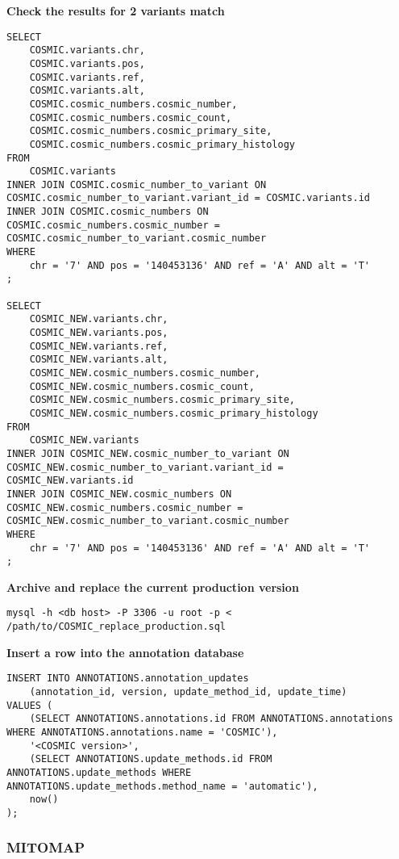 \documentclass[11pt, a4paper]{article}
\begin{document}
\textbf{Check the results for 2 variants match}

\begin{lstlisting}
SELECT 
	COSMIC.variants.chr,
	COSMIC.variants.pos,
	COSMIC.variants.ref,
	COSMIC.variants.alt,
	COSMIC.cosmic_numbers.cosmic_number,
	COSMIC.cosmic_numbers.cosmic_count,
	COSMIC.cosmic_numbers.cosmic_primary_site,
	COSMIC.cosmic_numbers.cosmic_primary_histology
FROM 
	COSMIC.variants
INNER JOIN COSMIC.cosmic_number_to_variant ON COSMIC.cosmic_number_to_variant.variant_id = COSMIC.variants.id 
INNER JOIN COSMIC.cosmic_numbers ON COSMIC.cosmic_numbers.cosmic_number = COSMIC.cosmic_number_to_variant.cosmic_number 
WHERE 
	chr = '7' AND pos = '140453136' AND ref = 'A' AND alt = 'T'
;

SELECT 
	COSMIC_NEW.variants.chr,
	COSMIC_NEW.variants.pos,
	COSMIC_NEW.variants.ref,
	COSMIC_NEW.variants.alt,
	COSMIC_NEW.cosmic_numbers.cosmic_number,
	COSMIC_NEW.cosmic_numbers.cosmic_count,
	COSMIC_NEW.cosmic_numbers.cosmic_primary_site,
	COSMIC_NEW.cosmic_numbers.cosmic_primary_histology
FROM 
	COSMIC_NEW.variants
INNER JOIN COSMIC_NEW.cosmic_number_to_variant ON COSMIC_NEW.cosmic_number_to_variant.variant_id = COSMIC_NEW.variants.id 
INNER JOIN COSMIC_NEW.cosmic_numbers ON COSMIC_NEW.cosmic_numbers.cosmic_number = COSMIC_NEW.cosmic_number_to_variant.cosmic_number 
WHERE 
	chr = '7' AND pos = '140453136' AND ref = 'A' AND alt = 'T'
;
\end{lstlisting}

\textbf{Archive and replace the current production version}

\texttt{mysql -h <db host> -P 3306 -u root -p < /path/to/COSMIC\_replace\_production.sql}

\textbf{Insert a row into the annotation database}

\begin{lstlisting}
INSERT INTO ANNOTATIONS.annotation_updates 
	(annotation_id, version, update_method_id, update_time)
VALUES (
	(SELECT ANNOTATIONS.annotations.id FROM ANNOTATIONS.annotations WHERE ANNOTATIONS.annotations.name = 'COSMIC'),
	'<COSMIC version>',
	(SELECT ANNOTATIONS.update_methods.id FROM ANNOTATIONS.update_methods WHERE ANNOTATIONS.update_methods.method_name = 'automatic'),
	now()
);
\end{lstlisting}

\subsubsection{MITOMAP}
\end{document}
